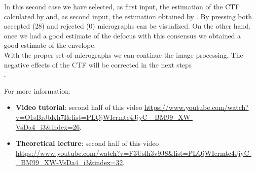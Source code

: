  In this second case we have selected, as first input, the estimation of the CTF calculated by  and, as second input, the estimation obtained by . By pressing  both accepted (28) and rejected (0) micrographs can be visualized. On the other hand, once we had a good estimate of the defocus with this consensus we obtained a good estimate of the envelope.\\ 

With the proper set of micrographs we can continue the image processing. The negative effects of the CTF will be corrected in the next steps\\.

For more information: 
\begin{itemize}
   \item \textbf{Video tutorial}: second half of this video \url{https://www.youtube.com/watch?v=O1sBrJbKh7I&list=PLQjWIcrmtc4JjyC-_BM99_XW-VsDa4_i3&index=26}.
   \item \textbf{Theoretical lecture}: second half of this video \url{https://www.youtube.com/watch?v=F3Uslh3v9J8&list=PLQjWIcrmtc4JjyC-_BM99_XW-VsDa4_i3&index=32}.
  \end{itemize}

